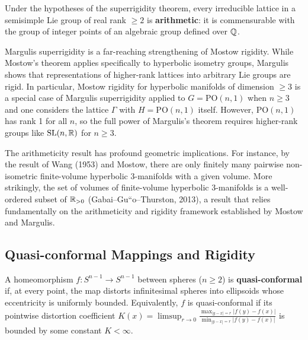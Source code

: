 \begin{theorem}
Under the hypotheses of the superrigidity theorem, every irreducible lattice in a semisimple Lie group of real rank $\geq 2$ is \textbf{arithmetic}: it is commensurable with the group of integer points of an algebraic group defined over $\mathbb{Q}$.
\end{theorem}

\begin{remark}
Margulis superrigidity is a far-reaching strengthening of Mostow rigidity. While Mostow's theorem applies specifically to hyperbolic isometry groups, Margulis shows that representations of higher-rank lattices into arbitrary Lie groups are rigid. In particular, Mostow rigidity for hyperbolic manifolds of dimension $\geq 3$ is a special case of Margulis superrigidity applied to $G = \mathrm{PO}(n,1)$ when $n \geq 3$ and one considers the lattice $\Gamma$ with $H = \mathrm{PO}(n,1)$ itself. However, $\mathrm{PO}(n,1)$ has rank 1 for all $n$, so the full power of Margulis's theorem requires higher-rank groups like $\operatorname{SL}(n,\mathbb{R})$ for $n \geq 3$.
\end{remark}

\begin{remark}
The arithmeticity result has profound geometric implications. For instance, by the result of Wang (1953) and Mostow, there are only finitely many pairwise non-isometric finite-volume hyperbolic 3-manifolds with a given volume. More strikingly, the set of volumes of finite-volume hyperbolic 3-manifolds is a well-ordered subset of $\mathbb{R}_{>0}$ (Gabai--Gu``o--Thurston, 2013), a result that relies fundamentally on the arithmeticity and rigidity framework established by Mostow and Margulis.
\end{remark}

\subsection{Quasi-conformal Mappings and Rigidity}

\begin{definition}
A homeomorphism $f: S^{n-1} \to S^{n-1}$ between spheres ($n \geq 2$) is \textbf{quasi-conformal} if, at every point, the map distorts infinitesimal spheres into ellipsoids whose eccentricity is uniformly bounded. Equivalently, $f$ is quasi-conformal if its pointwise distortion coefficient $K(x) = \limsup_{r \to 0} \frac{\max_{|y-x|=r} |f(y)-f(x)|}{\min_{|y-x|=r} |f(y)-f(x)|}$ is bounded by some constant $K < \infty$.
\end{definition}

